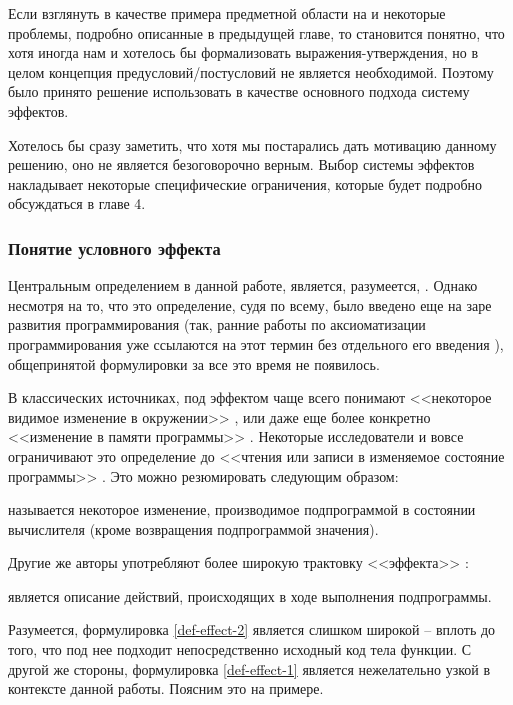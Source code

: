 Если взглянуть в качестве примера предметной области на  и некоторые проблемы, подробно описанные в предыдущей главе, то становится понятно, что хотя иногда нам и хотелось бы формализовать выражения-утверждения, но в целом концепция предусловий/постусловий не является необходимой. Поэтому было принято решение использовать в качестве основного подхода систему эффектов.

Хотелось бы сразу заметить, что хотя мы постарались дать мотивацию данному решению, оно не является безоговорочно верным. Выбор системы эффектов накладывает некоторые специфические ограничения, которые будет подробно обсуждаться в главе 4. 



\subsubsection{Понятие условного эффекта}

Центральным определением в данной работе, является, разумеется, . Однако несмотря на то, что это определение, судя по всему, было введено еще на заре развития программирования (так, ранние работы по аксиоматизации программирования уже ссылаются на этот термин без отдельного его введения \cite{Hoare69, Schwartz67}), общепринятой формулировки за все это время не появилось. 

В классических источниках, под эффектом чаще всего понимают <<некоторое видимое изменение в окружении>> \cite{Luc88}, или даже еще более конкретно <<изменение в памяти программы>> \cite{Vak09}. Некоторые исследователи и вовсе ограничивают это определение до <<чтения или записи в изменяемое состояние программы>> \cite{Green99}. Это можно резюмировать следующим образом:

\begin{definition}
    \label{def-effect-1}
     называется некоторое изменение, производимое подпрограммой в состоянии вычислителя (кроме возвращения подпрограммой значения).
\end{definition}

Другие же авторы употребляют более широкую трактовку <<эффекта>> \cite{Nielson99}: 

\begin{definition}
    \label{def-effect-2}
     является описание действий, происходящих в ходе выполнения подпрограммы.
\end{definition}

Разумеется, формулировка \ref{def-effect-2} является слишком широкой -- вплоть до того, что под нее подходит непосредственно исходный код тела функции. С другой же стороны, формулировка \ref{def-effect-1} является нежелательно узкой в контексте данной работы. Поясним это на примере. 

